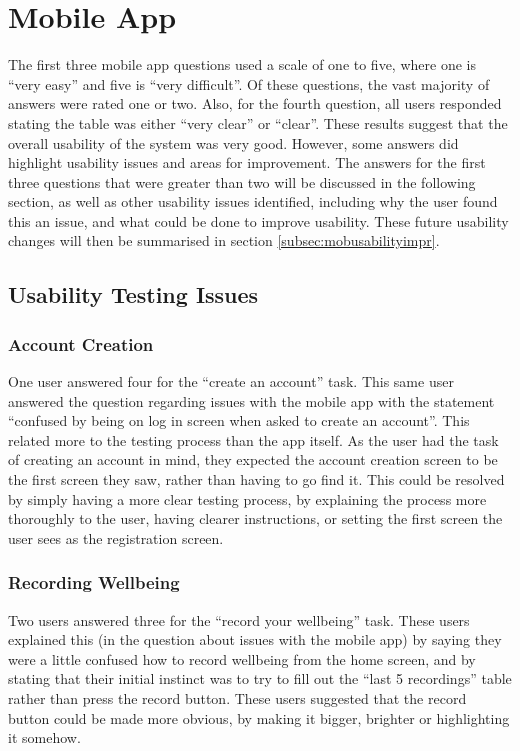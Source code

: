 \documentclass[11pt,openright,a4paper]{report}
\begin{document}
\section{Mobile App}
The first three mobile app questions used a scale of one to five, where one is \enquote{very easy} and five is \enquote{very difficult}. Of these questions, the vast majority of answers were rated one or two. Also, for the fourth question, all users responded stating the table was either \enquote{very clear} or \enquote{clear}. These results suggest that the overall usability of the system was very good. However, some answers did highlight usability issues and areas for improvement. The answers for the first three questions that were greater than two will be discussed in the following section, as well as other usability issues identified, including why the user found this an issue, and what could be done to improve usability. These future usability changes will then be summarised in section \ref{subsec:mobusabilityimpr}.

\subsection{Usability Testing Issues}
\subsubsection{Account Creation}
One user answered four for the \enquote{create an account} task. This same user answered the question regarding issues with the mobile app with the statement \enquote{confused by being on log in screen when asked to create an account}. This related more to the testing process than the app itself. As the user had the task of creating an account in mind, they expected the account creation screen to be the first screen they saw, rather than having to go find it. This could be resolved by simply having a more clear testing process, by explaining the process more thoroughly to the user, having clearer instructions, or setting the first screen the user sees as the registration screen.

\subsubsection{Recording Wellbeing}
Two users answered three for the \enquote{record your wellbeing} task. These users explained this (in the question about issues with the mobile app) by saying they were a little confused how to record wellbeing from the home screen, and by stating that their initial instinct was to try to fill out the \enquote{last 5 recordings} table rather than press the record button. These users suggested that the record button could be made more obvious, by making it bigger, brighter or highlighting it somehow.
\end{document}

